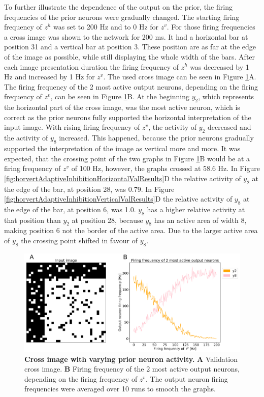 To further illustrate the dependence of the output on the prior, the firing frequencies of the prior neurons were gradually changed. The starting firing frequency of $z^h$ was set to 200 Hz and to 0 Hz for $z^v$. For those firing frequencies a cross image was shown to the network for 200 ms. It had a horizontal bar at position 31 and a vertical bar at position 3. These position are as far at the edge of the image as possible, while still displaying the whole width of the bars. After each image presentation duration the firing frequency of $z^h$ was decreased by 1 Hz and increased by 1 Hz for $z^v$. The used cross image can be seen in Figure \ref{fig:horvertAdaptiveInhibitionVariablePriorResults}A. The firing frequency of the 2 most active output neurons, depending on the firing frequency of $z^v$, can be seen in Figure \ref{fig:horvertAdaptiveInhibitionVariablePriorResults}B. At the beginning $y_2$, which represents the horizontal part of the cross image, was the most active neuron, which is correct as the prior neurons fully supported the horizontal interpretation of the input image. With rising firing frequency of $z^v$, the activity of $y_2$ decreased and the activity of $y_8$ increased. This happened, because the prior neurons gradually supported the interpretation of the image as vertical more and more. It was expected, that the crossing point of the two graphs in Figure \ref{fig:horvertAdaptiveInhibitionVariablePriorResults}B would be at a firing frequency of $z^v$ of 100 Hz, however, the graphs crossed at 58.6 Hz. In Figure \ref{fig:horvertAdaptiveInhibitionHorizontalValResults}D the relative activity of $y_2$ at the edge of the bar, at position 28, was 0.79. In Figure \ref{fig:horvertAdaptiveInhibitionVerticalValResults}D the relative activity of $y_8$ at the edge of the bar, at position 6, was 1.0. $y_8$ has a higher relative activity at that position than $y_2$ at position 28, because $y_8$ has an  active area of width 8, making position 6 not the border of the active area. Due to the larger active area of $y_8$ the crossing point shifted in favour of $y_8$.

\begin{figure}
  \includegraphics[width=\linewidth]{figures/horvertAdaptiveInh/YFrequency_prior.png}
  \caption{\textbf{Cross image with varying prior neuron activity.} \textbf{A} Validation cross image. \textbf{B} Firing frequency of the 2 most active output neurons, depending on the firing frequency of $z^v$. The output neuron firing frequencies were averaged over 10 runs to smooth the graphs.}
  \label{fig:horvertAdaptiveInhibitionVariablePriorResults}
\end{figure}
